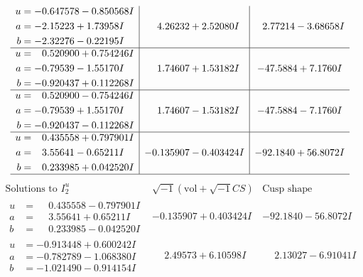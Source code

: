 \documentclass[1p]{elsarticle_modified}
\theoremstyle{definition}
\newcommand{\I}{\sqrt{-1}}
\begin{document}
$$\begin{array}{c|c|c}
\begin{aligned}
u &= -0.647578 - 0.850568 I \\
a &= -2.15223 + 1.73958 I \\
b &= -2.32276 - 0.22195 I\end{aligned}
 & \phantom{-}4.26232 + 2.52080 I & \phantom{-}2.77214 - 3.68658 I \\ \hline\begin{aligned}
u &= \phantom{-}0.520900 + 0.754246 I \\
a &= -0.79539 - 1.55170 I \\
b &= -0.920437 + 0.112268 I\end{aligned}
 & \phantom{-}1.74607 + 1.53182 I & -47.5884 + 7.1760 I \\ \hline\begin{aligned}
u &= \phantom{-}0.520900 - 0.754246 I \\
a &= -0.79539 + 1.55170 I \\
b &= -0.920437 - 0.112268 I\end{aligned}
 & \phantom{-}1.74607 - 1.53182 I & -47.5884 - 7.1760 I \\ \hline\begin{aligned}
u &= \phantom{-}0.435558 + 0.797901 I \\
a &= \phantom{-}3.55641 - 0.65211 I \\
b &= \phantom{-}0.233985 + 0.042520 I\end{aligned}
 & -0.135907 - 0.403424 I & -92.1840 + 56.8072 I\\
 \hline 
 \end{array}$$\newpage$$\begin{array}{c|c|c}  
\text{Solutions to }I^u_{2}& \I (\text{vol} + \sqrt{-1}CS) & \text{Cusp shape}\\
 \hline 
\begin{aligned}
u &= \phantom{-}0.435558 - 0.797901 I \\
a &= \phantom{-}3.55641 + 0.65211 I \\
b &= \phantom{-}0.233985 - 0.042520 I\end{aligned}
 & -0.135907 + 0.403424 I & -92.1840 - 56.8072 I \\ \hline\begin{aligned}
u &= -0.913448 + 0.600242 I \\
a &= -0.782789 - 1.068380 I \\
b &= -1.021490 - 0.914154 I\end{aligned}
 & \phantom{-}2.49573 + 6.10598 I & \phantom{-}2.13027 - 6.91041 I \\ \hline\begin{aligned}

\end{aligned}
\end{array}$$
\end{document}

